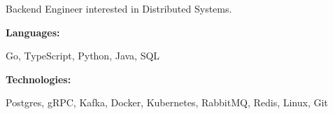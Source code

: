 \documentclass[9pt]{developercv} %
\begin{document}
\begin{minipage}[t]{0.46\textwidth}
	\vspace{-6pt}
	Backend Engineer interested in Distributed Systems.
	\vspace{-6pt}
\end{minipage}
\hfill %
\begin{minipage}[t]{0.465\textwidth}
	\vspace{-6pt}

	\begin{minipage}[t]{0.2\textwidth}
		\textbf{Languages:}
	\end{minipage}
	\hfill
	\begin{minipage}[t]{0.73\textwidth}
		Go, TypeScript, Python, Java, SQL
	\end{minipage}
	\vspace{4mm}

	\begin{minipage}[t]{0.2\textwidth}
		\textbf{Technologies:}
	\end{minipage}
	\hfill
	\begin{minipage}[t]{0.73\textwidth}
		Postgres, gRPC, Kafka, Docker, Kubernetes, RabbitMQ, Redis, Linux, Git
	\end{minipage}

\end{minipage}
\end{document}
